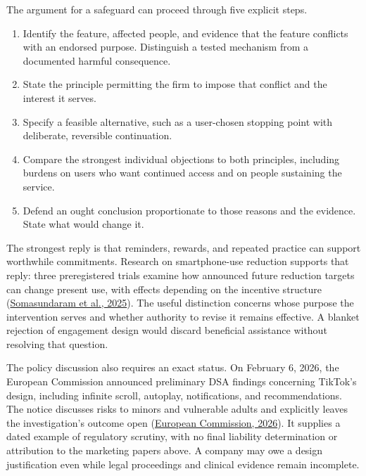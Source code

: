 The argument for a safeguard can proceed through five explicit steps.

\begin{enumerate}
\def\labelenumi{\arabic{enumi}.}
\tightlist
\item
  Identify the feature, affected people, and evidence that the feature
  conflicts with an endorsed purpose. Distinguish a tested mechanism
  from a documented harmful consequence.
\item
  State the principle permitting the firm to impose that conflict and
  the interest it serves.
\item
  Specify a feasible alternative, such as a user-chosen stopping point
  with deliberate, reversible continuation.
\item
  Compare the strongest individual objections to both principles,
  including burdens on users who want continued access and on people
  sustaining the service.
\item
  Defend an ought conclusion proportionate to those reasons and the
  evidence. State what would change it.
\end{enumerate}

The strongest reply is that reminders, rewards, and repeated practice
can support worthwhile commitments. Research on smartphone-use reduction
supports that reply: three preregistered trials examine how announced
future reduction targets can change present use, with effects depending
on the incentive structure
(\href{https://doi.org/10.1177/00222429251405841}{Somasundaram et al.,
2025}). The useful distinction concerns whose purpose the intervention
serves and whether authority to revise it remains effective. A blanket
rejection of engagement design would discard beneficial assistance
without resolving that question.

The policy discussion also requires an exact status. On February 6,
2026, the European Commission announced preliminary DSA findings
concerning TikTok's design, including infinite scroll, autoplay,
notifications, and recommendations. The notice discusses risks to minors
and vulnerable adults and explicitly leaves the investigation's outcome
open
(\href{https://digital-strategy.ec.europa.eu/en/news/commission-preliminarily-finds-tiktoks-addictive-design-breach-digital-services-act}{European
Commission, 2026}). It supplies a dated example of regulatory scrutiny,
with no final liability determination or attribution to the marketing
papers above. A company may owe a design justification even while legal
proceedings and clinical evidence remain incomplete.

